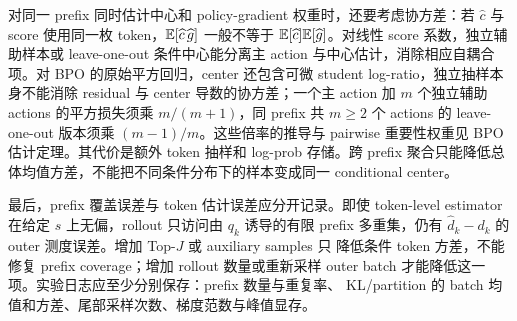 对同一 prefix 同时估计中心和 policy-gradient 权重时，还要考虑协方差：若 $\widehat c$ 与 score 使用同一枚 token，$\mathbb E[\widehat c\,\widehat g]$ 一般不等于 $\mathbb E[\widehat c]\mathbb E[\widehat g]$。对线性 score 系数，独立辅助样本或 leave-one-out 条件中心能分离主 action 与中心估计，消除相应自耦合项。对 BPO 的原始平方回归，center 还包含可微 student log-ratio，独立抽样本身不能消除 residual 与 center 导数的协方差；一个主 action 加 $m$ 个独立辅助 actions 的平方损失须乘 $m/(m+1)$，同 prefix 共 $m\ge2$ 个 actions 的 leave-one-out 版本须乘 $(m-1)/m$。这些倍率的推导与 pairwise 重要性权重见 BPO 估计定理。其代价是额外 token 抽样和 log-prob 存储。跨 prefix 聚合只能降低总体均值方差，不能把不同条件分布下的样本变成同一 conditional center。

最后，prefix 覆盖误差与 token 估计误差应分开记录。即使 token-level estimator 在给定 $s$ 上无偏，rollout 只访问由 $q_k$ 诱导的有限 prefix 多重集，仍有 $\widehat d_k-d_k$ 的 outer 测度误差。增加 Top-$J$ 或 auxiliary samples 只 降低条件 token 方差，不能修复 prefix coverage；增加 rollout 数量或重新采样 outer batch 才能降低这一项。实验日志应至少分别保存：prefix 数量与重复率、 KL/partition 的 batch 均值和方差、尾部采样次数、梯度范数与峰值显存。
